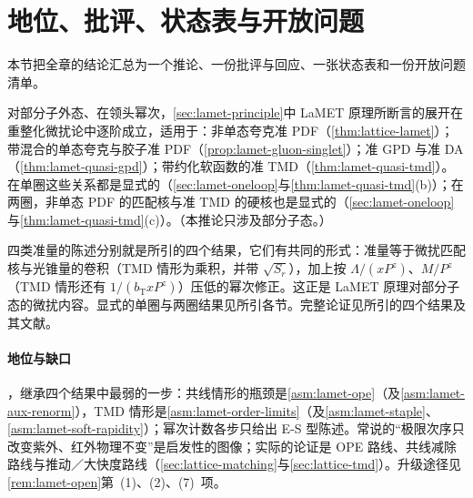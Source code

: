 \section{地位、批评、状态表与开放问题}\label{sec:lattice-status}

本节把全章的结论汇总为一个推论、一份批评与回应、一张状态表和一份开放问题清单。

\begin{corollary}\label{cor:lamet-principle-pt}
对部分子外态、在领头幂次，\cref{sec:lamet-principle}中 LaMET 原理所断言的展开在重整化微扰论中逐阶成立，适用于：非单态夸克准 PDF（\cref{thm:lattice-lamet}）；带混合的单态夸克与胶子准 PDF（\cref{prop:lamet-gluon-singlet}）；准 GPD 与准 DA（\cref{thm:lamet-quasi-gpd}）；带约化软函数的准 TMD（\cref{thm:lamet-quasi-tmd}）。在单圈这些关系都是显式的（\cref{sec:lamet-oneloop}与\cref{thm:lamet-quasi-tmd}(b)）；在两圈，非单态 PDF 的匹配核与准 TMD 的硬核也是显式的（\cref{sec:lamet-oneloop}与\cref{thm:lamet-quasi-tmd}(c)）。（本推论只涉及部分子态。）
\end{corollary}

\begin{proofsketch}
四类准量的陈述分别就是所引的四个结果，它们有共同的形式：准量等于微扰匹配核与光锥量的卷积（TMD 情形为乘积，并带 $\sqrt{S_r}$），加上按 $\Lambda/(xP^z)$、$M/P^z$（TMD 情形还有 $1/(b_{\mathrm T}xP^z)$）压低的幂次修正。这正是 LaMET 原理对部分子态的微扰内容。显式的单圈与两圈结果见所引各节。完整论证见所引的四个结果及其文献。
\end{proofsketch}

\paragraph{地位与缺口}
\tagA，继承四个结果中最弱的一步：共线情形的瓶颈是\cref{asm:lamet-ope}（及\cref{asm:lamet-aux-renorm}），TMD 情形是\cref{asm:lamet-order-limits}（及\cref{asm:lamet-staple}、\cref{asm:lamet-soft-rapidity}）；幂次计数各步只给出 E-S 型陈述。常说的“极限次序只改变紫外、红外物理不变”是启发性的图像；实际的论证是 OPE 路线、共线减除路线与推动／大快度路线（\cref{sec:lattice-matching}与\cref{sec:lattice-tmd}）。升级途径见\cref{rem:lamet-open}第~(1)、(2)、(7)~项。

